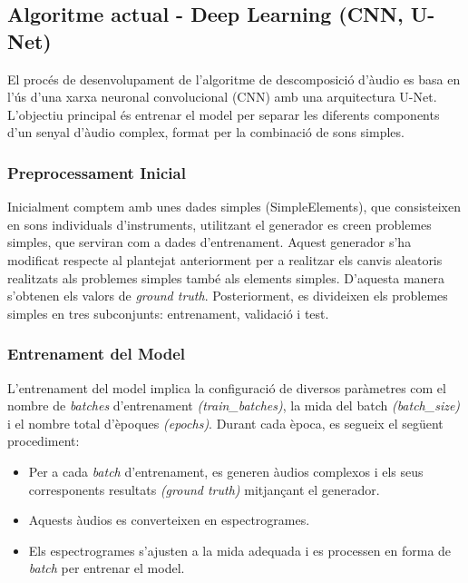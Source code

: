 \documentclass[10pt,a4paper,twocolumn,twoside]{article}
\begin{document}
\subsection{Algoritme actual - Deep Learning (CNN, U-Net)}

El procés de desenvolupament de l'algoritme de descomposició d'àudio es basa en l'ús d'una xarxa neuronal convolucional (CNN) amb una arquitectura U-Net. L'objectiu principal és entrenar el model per separar les diferents components d'un senyal d'àudio complex, format per la combinació de sons simples.

\subsubsection{Preprocessament Inicial}

Inicialment comptem amb unes dades simples (SimpleElements), que consisteixen en sons individuals d'instruments, utilitzant el generador es creen problemes simples, que serviran com a dades d'entrenament. Aquest generador s'ha modificat respecte al plantejat anteriorment per a realitzar els canvis aleatoris realitzats als problemes simples també als elements simples. D'aquesta manera s'obtenen els valors de \textit{ground truth}. Posteriorment, es divideixen els problemes simples en tres subconjunts: entrenament, validació i test.

\subsubsection{Entrenament del Model}

L'entrenament del model implica la configuració de diversos paràmetres com el nombre de \textit{batches} d'entrenament \textit{(train\_batches)}, la mida del batch \textit{(batch\_size)} i el nombre total d'èpoques \textit{(epochs)}. Durant cada època, es segueix el següent procediment:

\begin{itemize}
    \item Per a cada \textit{batch} d'entrenament, es generen àudios complexos i els seus corresponents resultats \textit{(ground truth)} mitjançant el generador.
    \item Aquests àudios es converteixen en espectrogrames.
    \item Els espectrogrames s'ajusten a la mida adequada i es processen en forma de \textit{batch} per entrenar el model.
\end{itemize}
\end{document}
